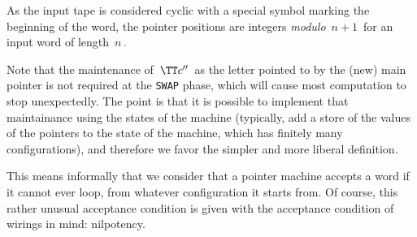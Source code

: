 \smallskip
As the input tape is considered cyclic with a special symbol marking the beginning of the word, the pointer positions are integers \emph{modulo} $\,n+1\,$ for an input word of length $\,n\,$.


Note that the maintenance of $\,\TT c''\,$ as the letter pointed to by the (new) main pointer is not required at the \texttt{SWAP} phase, which will cause most computation to stop unexpectedly. The point is that it is possible to implement that maintainance using the states of the machine (typically, add a store of the values of the pointers to the state of the machine, which has finitely many configurations), and therefore we favor the simpler and more liberal definition.


This means informally that we consider that a pointer machine accepts a word if it cannot ever loop, from whatever configuration it starts from. Of course, this rather unusual acceptance condition is given with the acceptance condition of wirings in mind: nilpotency.

